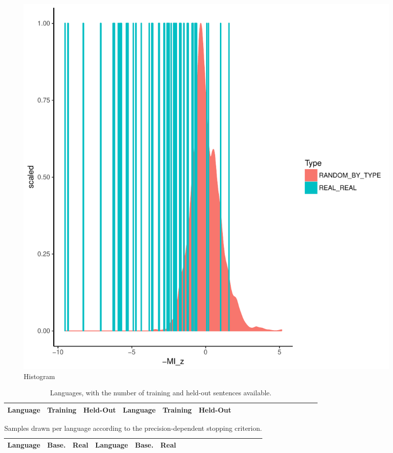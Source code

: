 \documentclass[11pt,letterpaper]{article}
\begin{document}
\begin{figure}
\includegraphics[width=0.95\textwidth]{../code/analyze_neural/figures/full-REAL-listener-surprisal-memory-HIST_z_byMem_onlyWordForms_boundedVocab.pdf}
\caption{Histogram}\label{fig:hist-real}
\end{figure}


\begin{table}
\begin{longtable}{l|ll||l|llllllllllllll}
	Language & Training & Held-Out & 	Language & Training & Held-Out\\ \hline

\end{longtable}
	\caption{Languages, with the number of training and held-out sentences available.}\label{tab:corpora}
\end{table}

\begin{table}
\begin{longtable}{l|ll||l|llllllllllllll}
	Language & Base. & Real & Language & Base. & Real \\ \hline

\end{longtable}
	\caption{Samples drawn per language according to the precision-dependent stopping criterion.}\label{tab:samples}
\end{table}
\end{document}

